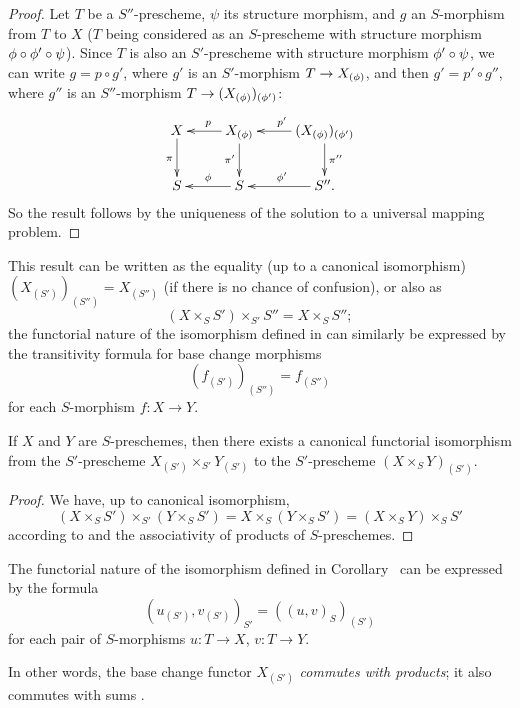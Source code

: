 \begin{proof}
\label{proof-I.3.3.9}
Let $T$ be a $S''$-prescheme, $\psi$ its structure morphism, and $g$ an
$S$-morphism from $T$ to $X$ ($T$ being considered as an $S$-prescheme with
structure morphism $\phi\circ\phi'\circ\psi$). Since $T$ is also an $S'$-prescheme
with structure morphism $\phi'\circ\psi$, we can write $g=p\circ g'$, where
$g'$ is an $S'$-morphism $T\to X_{(\vphi)}$, and then $g'=p'\circ g''$, where
$g''$ is an $S''$-morphism $T\to(X_{(\vphi)})_{(\vphi')}$:
\[
  \xymatrix{
    X\ar[d]_\pi &
    X_{(\vphi)}\ar[l]_p\ar[d]_{\pi'} &
    (X_{(\vphi)})_{(\vphi')}\ar[l]_{p'}\ar[d]^{\pi''}\\
    S &
    S\ar[l]_\vphi &
    S''\ar[l]_{\vphi'}.
  }
\]
So the result follows by the uniqueness of the solution to a universal
mapping problem.
\end{proof}

This result can be written as the equality (up to a canonical isomorphism)
$(X_{(S')})_{(S'')}=X_{(S'')}$ (if there is no chance of confusion), or also as
\[
\label{I.3.3.9.1}
  (X\times_S S')\times_{S'}S''=X\times_S S'';
  \tag{3.3.9.1}
\]
the functorial nature of the isomorphism defined in  can
similarly be expressed by the transitivity formula for base change morphisms
\[
\label{I.3.3.9.2}
  (f_{(S')})_{(S'')}=f_{(S'')}
  \tag{3.3.9.2}
\]
for each $S$-morphism $f:X\to Y$.

\begin{corollary}[3.3.10]
\label{I.3.3.10}
If $X$ and $Y$ are $S$-preschemes, then there exists a canonical functorial
isomorphism from the $S'$-prescheme $X_{(S')}\times_{S'}Y_{(S')}$ to the
$S'$-prescheme $(X\times_S Y)_{(S')}$.
\end{corollary}

\begin{proof}
\label{proof-I.3.3.10}
We have, up to canonical isomorphism,
\[
  (X\times_S S')\times_{S'}(Y\times_S S')
  =X\times_S(Y\times_S S')=(X\times_S Y)\times_S S'
\]
according to  and the associativity of products of $S$-preschemes.
\end{proof}

The functorial nature of the isomorphism defined in
Corollary~ can be expressed by the formula
\[
\label{I.3.3.10.1}
  (u_{(S')},v_{(S')})_{S'}=((u,v)_S)_{(S')}
  \tag{3.3.10.1}
\]
for each pair of $S$-morphisms $u:T\to X$, $v:T\to Y$.

In other words, the base change functor $X_{(S')}$ \emph{commutes with
products}; it also commutes with sums .

